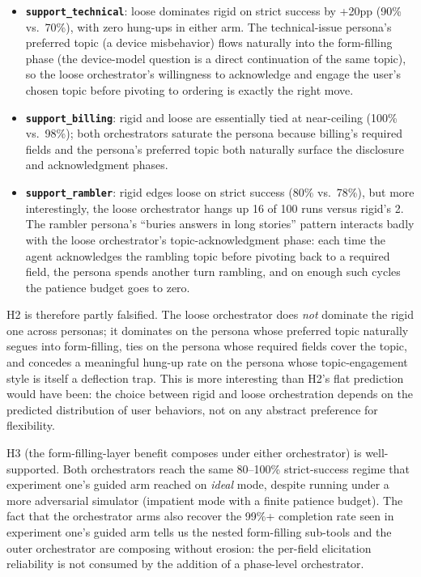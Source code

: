 \documentclass[11pt,a4paper]{article}
\begin{document}
\begin{itemize}[noitemsep]
    \item \textbf{\texttt{support\_technical}}: loose dominates rigid on strict success by +20pp (90\% vs.\ 70\%), with zero hung-ups in either arm. The technical-issue persona's preferred topic (a device misbehavior) flows naturally into the form-filling phase (the device-model question is a direct continuation of the same topic), so the loose orchestrator's willingness to acknowledge and engage the user's chosen topic before pivoting to ordering is exactly the right move.
    \item \textbf{\texttt{support\_billing}}: rigid and loose are essentially tied at near-ceiling (100\% vs.\ 98\%); both orchestrators saturate the persona because billing's required fields and the persona's preferred topic both naturally surface the disclosure and acknowledgment phases.
    \item \textbf{\texttt{support\_rambler}}: rigid edges loose on strict success (80\% vs.\ 78\%), but more interestingly, the loose orchestrator hangs up 16 of 100 runs versus rigid's 2. The rambler persona's ``buries answers in long stories'' pattern interacts badly with the loose orchestrator's topic-acknowledgment phase: each time the agent acknowledges the rambling topic before pivoting back to a required field, the persona spends another turn rambling, and on enough such cycles the patience budget goes to zero.
\end{itemize}

H2 is therefore partly falsified. The loose orchestrator does \emph{not} dominate the rigid one across personas; it dominates on the persona whose preferred topic naturally segues into form-filling, ties on the persona whose required fields cover the topic, and concedes a meaningful hung-up rate on the persona whose topic-engagement style is itself a deflection trap. This is more interesting than H2's flat prediction would have been: the choice between rigid and loose orchestration depends on the predicted distribution of user behaviors, not on any abstract preference for flexibility.

H3 (the form-filling-layer benefit composes under either orchestrator) is well-supported. Both orchestrators reach the same 80--100\% strict-success regime that experiment one's guided arm reached on \emph{ideal} mode, despite running under a more adversarial simulator (impatient mode with a finite patience budget). The fact that the orchestrator arms also recover the 99\%+ completion rate seen in experiment one's guided arm tells us the nested form-filling sub-tools and the outer orchestrator are composing without erosion: the per-field elicitation reliability is not consumed by the addition of a phase-level orchestrator.
\end{document}
